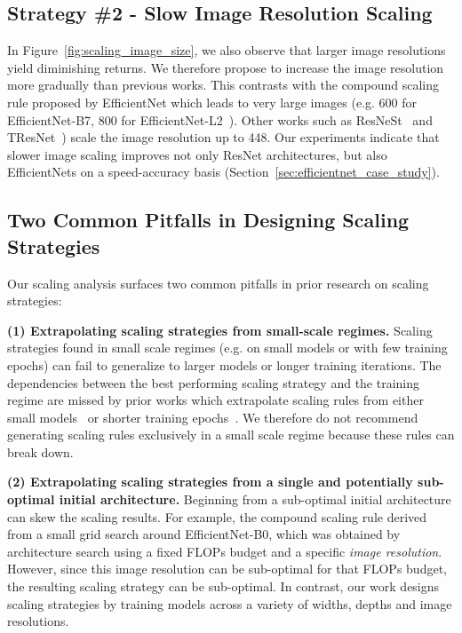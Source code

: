 \documentclass{article}
\begin{document}
\subsection{Strategy \#2 - Slow Image Resolution Scaling}
In Figure~\ref{fig:scaling_image_size}, we also observe that larger image resolutions yield diminishing returns.
We therefore propose to increase the image resolution more gradually than previous works.
This contrasts with the compound scaling rule proposed by EfficientNet which leads to very large images (e.g. 600 for EfficientNet-B7, 800 for EfficientNet-L2~\citep{xie2020self}).
Other works such as ResNeSt~\cite{zhang2020resnest} and TResNet~\cite{ridnik2020tresnet}) scale the image resolution up to 448.
Our experiments indicate that slower image scaling improves not only ResNet architectures, but also EfficientNets on a speed-accuracy basis (Section~\ref{sec:efficientnet_case_study}).

\subsection{Two Common Pitfalls in Designing Scaling Strategies} 
Our scaling analysis surfaces two common pitfalls in prior research on scaling strategies: 

\textbf{(1) Extrapolating scaling strategies from small-scale regimes.}
Scaling strategies found in small scale regimes (e.g. on small models or with few training epochs) can fail to generalize to larger models or longer training iterations.
The dependencies between the best performing scaling strategy and the training regime are missed by prior works which extrapolate scaling rules from either small models~\cite{tan2019efficientnet} or shorter training epochs~\cite{radosavovic2020designing}.
We therefore do not recommend generating scaling rules exclusively in a small scale regime because these rules can break down.

\textbf{(2) Extrapolating scaling strategies from a single and potentially sub-optimal initial architecture.}
Beginning from a sub-optimal initial architecture can skew the scaling results.
For example, the compound scaling rule derived from a small grid search around EfficientNet-B0, which was obtained by architecture search using a fixed FLOPs budget and a specific \emph{image resolution}.
However, since this image resolution can be sub-optimal for that FLOPs budget, the resulting scaling strategy can be sub-optimal.
In contrast, our work designs scaling strategies by training models across a variety of widths, depths and image resolutions.
\end{document}
